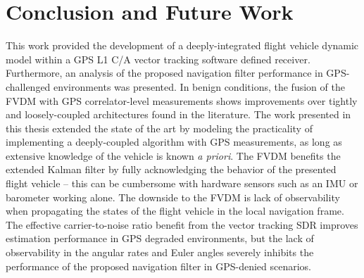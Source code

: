 \chapter{Conclusion and Future Work}
This work provided the development of a deeply-integrated flight vehicle dynamic model within a GPS L1 C/A vector tracking software defined receiver. Furthermore, an analysis of the proposed navigation filter performance in GPS-challenged environments was presented. In benign conditions, the fusion of the FVDM with GPS correlator-level measurements shows improvements over tightly and loosely-coupled architectures found in the literature. The work presented in this thesis extended the state of the art by modeling the practicality of implementing a deeply-coupled algorithm with GPS measurements, as long as extensive knowledge of the vehicle is known \textit{a priori}. The FVDM benefits the extended Kalman filter by fully acknowledging the behavior of the presented flight vehicle {--} this can be cumbersome with hardware sensors such as an IMU or barometer working alone. The downside to the FVDM is lack of observability when propagating the states of the flight vehicle in the local navigation frame. The effective carrier-to-noise ratio benefit from the vector tracking SDR improves estimation performance in GPS degraded environments, but the lack of observability in the angular rates and Euler angles severely inhibits the performance of the proposed navigation filter in GPS-denied scenarios.

